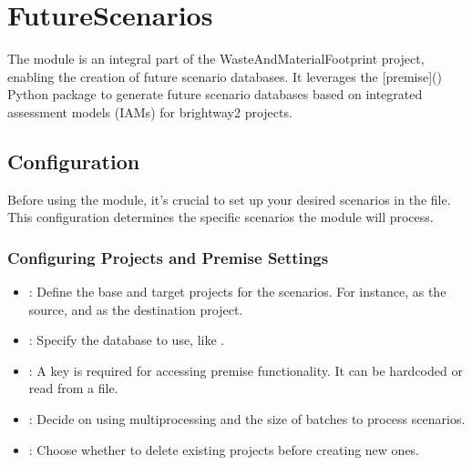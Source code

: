 \documentclass[letterpaper,10pt,english]{sphinxmanual}
\begin{document}
\sphinxstepscope


\section{FutureScenarios}
\label{\detokenize{FutureScenarios:futurescenarios}}\label{\detokenize{FutureScenarios::doc}}
\sphinxAtStartPar
The  module is an integral part of the WasteAndMaterialFootprint project, enabling the creation of future scenario databases. It leverages the {[}premise{]}() Python package to generate future scenario databases based on integrated assessment models (IAMs) for brightway2 projects.


\subsection{Configuration}
\label{\detokenize{FutureScenarios:configuration}}
\sphinxAtStartPar
Before using the  module, it’s crucial to set up your desired scenarios in the  file. This configuration determines the specific scenarios the module will process.


\subsubsection{Configuring Projects and Premise Settings}
\label{\detokenize{FutureScenarios:configuring-projects-and-premise-settings}}\begin{itemize}
\item {} 
\sphinxAtStartPar
{}: Define the base and target projects for the scenarios. For instance,  as the source, and  as the destination project.

\item {} 
\sphinxAtStartPar
{}: Specify the database to use, like .

\item {} 
\sphinxAtStartPar
{}: A key is required for accessing premise functionality. It can be hardcoded or read from a file.

\item {} 
\sphinxAtStartPar
{}: Decide on using multiprocessing and the size of batches to process scenarios.

\item {} 
\sphinxAtStartPar
{}: Choose whether to delete existing projects before creating new ones.

\end{itemize}
\end{document}

